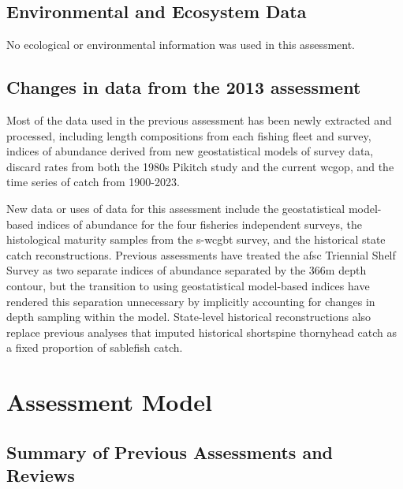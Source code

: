 \documentclass[11pt,
  english,
  letterpaper,
]{article}
\begin{document}
\hypertarget{environmental-and-ecosystem-data}{%
\subsection{Environmental and Ecosystem Data}\label{environmental-and-ecosystem-data}}

No ecological or environmental information was used in this assessment.

\hypertarget{changes-in-data-from-the-2013-assessment}{%
\subsection{Changes in data from the 2013 assessment}\label{changes-in-data-from-the-2013-assessment}}

Most of the data used in the previous assessment has been newly extracted and processed, including length compositions from each fishing fleet and survey, indices of abundance derived from new geostatistical models of survey data, discard rates from both the 1980s Pikitch study and the current \gls{wcgop}, and the time series of catch from 1900-2023.

New data or uses of data for this assessment include the geostatistical model-based indices of abundance for the four fisheries independent surveys, the histological maturity samples from the \gls {s-wcgbt} survey, and the historical state catch reconstructions. Previous assessments have treated the \gls{afsc} Triennial Shelf Survey as two separate indices of abundance separated by the 366m depth contour, but the transition to using geostatistical model-based indices have rendered this separation unnecessary by implicitly accounting for changes in depth sampling within the model. State-level historical reconstructions also replace previous analyses that imputed historical shortspine thornyhead catch as a fixed proportion of sablefish catch.

\hypertarget{assessment-model}{%
\section{Assessment Model}\label{assessment-model}}

\hypertarget{summary-of-previous-assessments-and-reviews}{%
\subsection{Summary of Previous Assessments and Reviews}\label{summary-of-previous-assessments-and-reviews}}
\end{document}
